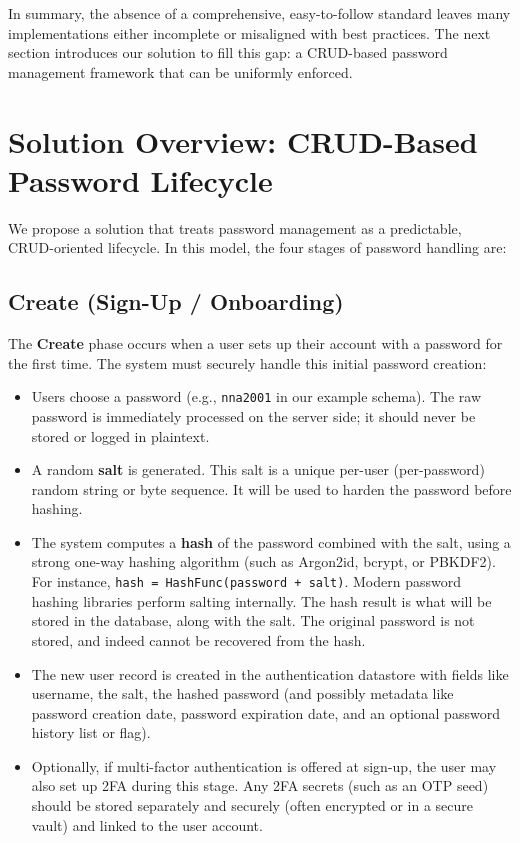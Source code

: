 \documentclass[11pt]{article}
\begin{document}
In summary, the absence of a comprehensive, easy-to-follow standard leaves many implementations either incomplete or misaligned with best practices. The next section introduces our solution to fill this gap: a CRUD-based password management framework that can be uniformly enforced.

\section{Solution Overview: CRUD-Based Password Lifecycle}
We propose a solution that treats password management as a predictable, CRUD-oriented lifecycle. In this model, the four stages of password handling are:

\subsection{Create (Sign-Up / Onboarding)}
The \textbf{Create} phase occurs when a user sets up their account with a password for the first time. The system must securely handle this initial password creation:
\begin{itemize}
    \item Users choose a password (e.g., \texttt{nna2001} in our example schema). The raw password is immediately processed on the server side; it should never be stored or logged in plaintext.
    \item A random \textbf{salt} is generated. This salt is a unique per-user (per-password) random string or byte sequence. It will be used to harden the password before hashing.
    \item The system computes a \textbf{hash} of the password combined with the salt, using a strong one-way hashing algorithm (such as Argon2id, bcrypt, or PBKDF2). For instance, \texttt{hash = HashFunc(password + salt)}. Modern password hashing libraries perform salting internally. The hash result is what will be stored in the database, along with the salt. The original password is not stored, and indeed cannot be recovered from the hash.
    \item The new user record is created in the authentication datastore with fields like username, the salt, the hashed password (and possibly metadata like password creation date, password expiration date, and an optional password history list or flag).
    \item Optionally, if multi-factor authentication is offered at sign-up, the user may also set up 2FA during this stage. Any 2FA secrets (such as an OTP seed) should be stored separately and securely (often encrypted or in a secure vault) and linked to the user account.
\end{itemize}
\end{document}
